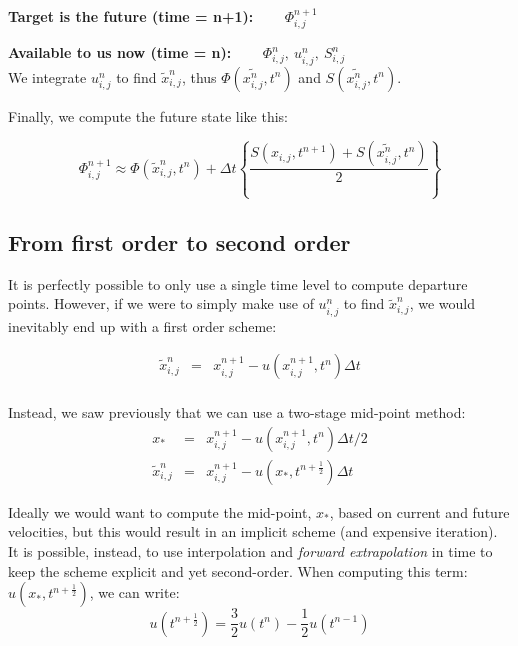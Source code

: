 {\bf Target is the future (time = n+1): ~ ~ }  $\Phi^{n+1}_{i,j}$ \\
			
\medskip
			
{\bf Available to us now (time = n):  ~ ~ }  $\Phi^n_{i,j}, ~ u^n_{i,j}, ~ S^n_{i,j}$ \\
			
We integrate ${u}^n_{i,j}$ to find $\tilde{x}^n_{i,j}$, thus $\Phi (\tilde{x_{i,j}^n},t^{n})$ and $S(\tilde{x_{i,j}^n},t^{n})$.
			
Finally, we compute the future state like this: 

\begin{equation}
			\Phi^{n+1}_{i,j}  \approx  \Phi(\tilde{x}^n_{i,j}, t^n) 
			+ \Delta t \left\{ \frac{S(x_{i,j},t^{n+1}) + S (\tilde{x_{i,j}^n},t^{n})}{2}\right\} 
\end{equation}


\subsection{From first order to second order}

	
	It is perfectly possible to only use a single time level to compute departure points. However, if we were to simply make use of $u^n_{i,j}$ to find $\tilde{x}^n_{i,j}$, we would inevitably end up with a first order scheme:
	
	\begin{eqnarray*}
		\tilde{x}^n_{i,j} & = & x^{n+1}_{i,j}-u(x^{n+1}_{i,j},t^n) \Delta t \\
	\end{eqnarray*}
		
	Instead, we saw previously that we can use a two-stage mid-point method:
	\begin{eqnarray*}
		x_* & = & x^{n+1}_{i,j}-u(x^{n+1}_{i,j},t^n) \Delta t/2 \\
		\tilde{x}^n_{i,j} & = & x^{n+1}_{i,j}-u(x_*,t^{n+\frac{1}{2}}) \Delta t
	\end{eqnarray*}
	
	Ideally we would want to compute the mid-point, $x_*$, based on current and future velocities, but this would result in an implicit scheme (and expensive iteration).\\
	
	It is possible, instead, to use interpolation and \emph{forward extrapolation} in time to keep the scheme explicit and yet second-order. When computing this term: $u(x_*,t^{n+\frac{1}{2}})$, we can write:
	\begin{equation}
	u(t^{n+\frac{1}{2}})=\frac{3}{2}u(t^n)-\frac{1}{2}u(t^{n-1})
	\end{equation}
	
